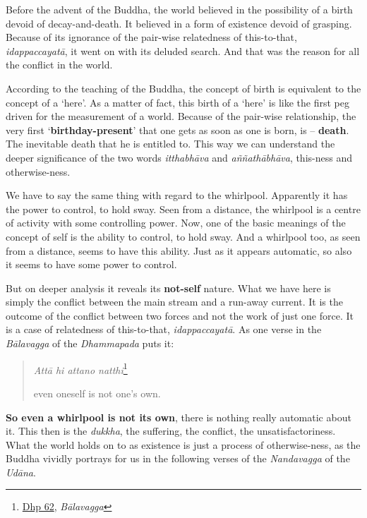 Before the advent of the Buddha, the world believed in the possibility of a birth devoid of decay-and-death. It believed in a form of existence devoid of grasping. Because of its ignorance of the pair-wise relatedness of this-to-that, \emph{idappaccayatā}, it went on with its deluded search. And that was the reason for all the conflict in the world.

According to the teaching of the Buddha, the concept of birth is equivalent to the concept of a `here'. As a matter of fact, this birth of a `here' is like the first peg driven for the measurement of a world. Because of the pair-wise relationship, the very first `\textbf{birthday-present}' that one gets as soon as one is born, is -- \textbf{death}. The inevitable death that he is entitled to. This way we can understand the deeper significance of the two words \emph{itthabhāva} and \emph{aññathābhāva}, this-ness and otherwise-ness.

We have to say the same thing with regard to the whirlpool. Apparently it has the power to control, to hold sway. Seen from a distance, the whirlpool is a centre of activity with some controlling power. Now, one of the basic meanings of the concept of self is the ability to control, to hold sway. And a whirlpool too, as seen from a distance, seems to have this ability. Just as it appears automatic, so also it seems to have some power to control.

But on deeper analysis it reveals its \textbf{not-self} nature. What we have here is simply the conflict between the main stream and a run-away current. It is the outcome of the conflict between two forces and not the work of just one force. It is a case of relatedness of this-to-that, \emph{idappaccayatā}. As one verse in the \emph{Bālavagga} of the \emph{Dhammapada} puts it:

\begin{quote}
\emph{Attā hi attano natthi}\footnote{\href{https://suttacentral.net/dhp60-75/pli/ms}{Dhp 62}, \emph{Bālavagga}}

even oneself is not one's own.
\end{quote}

\textbf{So even a whirlpool is not its own}, there is nothing really automatic about it. This then is the \emph{dukkha}, the suffering, the conflict, the unsatisfactoriness. What the world holds on to as existence is just a process of otherwise-ness, as the Buddha vividly portrays for us in the following verses of the \emph{Nandavagga} of the \emph{Udāna}.

